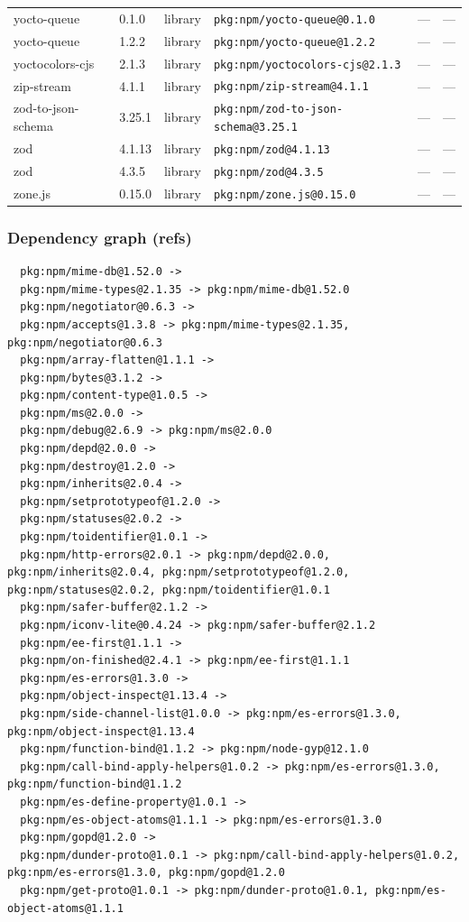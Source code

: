 \documentclass[11pt]{article}
\begin{document}
\begin{longtable}{|l|l|l|p{2.2cm}|l|p{4cm}|}
yocto-queue & 0.1.0 & library & \texttt{pkg:npm/yocto-queue@0.1.0} & — & — \\
yocto-queue & 1.2.2 & library & \texttt{pkg:npm/yocto-queue@1.2.2} & — & — \\
yoctocolors-cjs & 2.1.3 & library & \texttt{pkg:npm/yoctocolors-cjs@2.1.3} & — & — \\
zip-stream & 4.1.1 & library & \texttt{pkg:npm/zip-stream@4.1.1} & — & — \\
zod-to-json-schema & 3.25.1 & library & \texttt{pkg:npm/zod-to-json-schema@3.25.1} & — & — \\
zod & 4.1.13 & library & \texttt{pkg:npm/zod@4.1.13} & — & — \\
zod & 4.3.5 & library & \texttt{pkg:npm/zod@4.3.5} & — & — \\
zone.js & 0.15.0 & library & \texttt{pkg:npm/zone.js@0.15.0} & — & — \\
\hline
\end{longtable}

\subsubsection*{Dependency graph (refs)}
\begin{verbatim}
  pkg:npm/mime-db@1.52.0 -> 
  pkg:npm/mime-types@2.1.35 -> pkg:npm/mime-db@1.52.0
  pkg:npm/negotiator@0.6.3 -> 
  pkg:npm/accepts@1.3.8 -> pkg:npm/mime-types@2.1.35, pkg:npm/negotiator@0.6.3
  pkg:npm/array-flatten@1.1.1 -> 
  pkg:npm/bytes@3.1.2 -> 
  pkg:npm/content-type@1.0.5 -> 
  pkg:npm/ms@2.0.0 -> 
  pkg:npm/debug@2.6.9 -> pkg:npm/ms@2.0.0
  pkg:npm/depd@2.0.0 -> 
  pkg:npm/destroy@1.2.0 -> 
  pkg:npm/inherits@2.0.4 -> 
  pkg:npm/setprototypeof@1.2.0 -> 
  pkg:npm/statuses@2.0.2 -> 
  pkg:npm/toidentifier@1.0.1 -> 
  pkg:npm/http-errors@2.0.1 -> pkg:npm/depd@2.0.0, pkg:npm/inherits@2.0.4, pkg:npm/setprototypeof@1.2.0, pkg:npm/statuses@2.0.2, pkg:npm/toidentifier@1.0.1
  pkg:npm/safer-buffer@2.1.2 -> 
  pkg:npm/iconv-lite@0.4.24 -> pkg:npm/safer-buffer@2.1.2
  pkg:npm/ee-first@1.1.1 -> 
  pkg:npm/on-finished@2.4.1 -> pkg:npm/ee-first@1.1.1
  pkg:npm/es-errors@1.3.0 -> 
  pkg:npm/object-inspect@1.13.4 -> 
  pkg:npm/side-channel-list@1.0.0 -> pkg:npm/es-errors@1.3.0, pkg:npm/object-inspect@1.13.4
  pkg:npm/function-bind@1.1.2 -> pkg:npm/node-gyp@12.1.0
  pkg:npm/call-bind-apply-helpers@1.0.2 -> pkg:npm/es-errors@1.3.0, pkg:npm/function-bind@1.1.2
  pkg:npm/es-define-property@1.0.1 -> 
  pkg:npm/es-object-atoms@1.1.1 -> pkg:npm/es-errors@1.3.0
  pkg:npm/gopd@1.2.0 -> 
  pkg:npm/dunder-proto@1.0.1 -> pkg:npm/call-bind-apply-helpers@1.0.2, pkg:npm/es-errors@1.3.0, pkg:npm/gopd@1.2.0
  pkg:npm/get-proto@1.0.1 -> pkg:npm/dunder-proto@1.0.1, pkg:npm/es-object-atoms@1.1.1
\end{verbatim}
\end{document}
